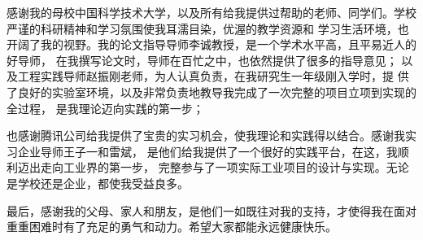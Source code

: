 
\begin{acknowledgements}


感谢我的母校中国科学技术大学，以及所有给我提供过帮助的老师、同学们。学校严谨的科研精神和学习氛围使我耳濡目染，优渥的教学资源和
学习生活环境，也开阔了我的视野。我的论文指导导师李诚教授，是一个学术水平高，且平易近人的好导师，
在我撰写论文时，导师在百忙之中，也依然提供了很多的指导意见； 以及工程实践导师赵振刚老师，为人认真负责，在我研究生一年级刚入学时，提
供了良好的实验室环境，以及非常负责地教导我完成了一次完整的项目立项到实现的全过程， 是我理论迈向实践的第一步；

也感谢腾讯公司给我提供了宝贵的实习机会，使我理论和实践得以结合。感谢我实习企业导师王子一和雷斌，
是他们给我提供了一个很好的实践平台，在这，我顺利迈出走向工业界的第一步， 完整参与了一项实际工业项目的设计与实现。无论是学校还是企业，都使我受益良多。

最后，感谢我的父母、家人和朋友，是他们一如既往对我的支持，才使得我在面对重重困难时有了充足的勇气和动力。希望大家都能永远健康快乐。



\end{acknowledgements}
